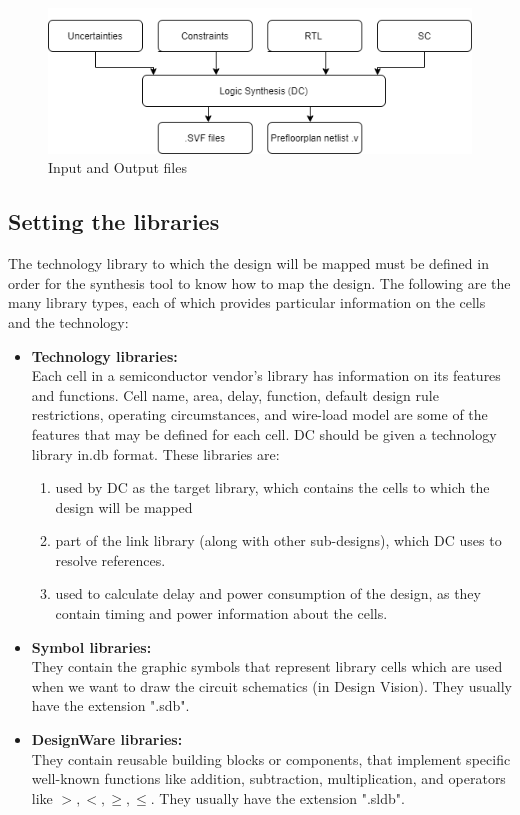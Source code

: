 \documentclass[../main.tex]{subfiles}
\begin{document}
\begin{figure}[h]
    \centering
    \includegraphics[scale = 0.8]{diagrams/ip_op_syn.png}
    \caption{Input and Output files}
    \label{fig:ip_op_syn}
\end{figure}
\subsection{Setting the libraries}
The technology library to which the design will be mapped must be defined in order for the synthesis tool to know how to map the design. The following are the many library types, each of which provides particular information on the cells and the technology:

\begin{itemize}
\item \textbf{Technology libraries:} \\
Each cell in a semiconductor vendor's library has information on its features and functions. Cell name, area, delay, function, default design rule restrictions, operating circumstances, and wire-load model are some of the features that may be defined for each cell. DC should be given a technology library in.db format. These libraries are:
    \begin{enumerate}
        \item used by DC as the target library, which contains the cells to which the design will be mapped
        \item part of the link library (along with other sub-designs), which DC uses to resolve references.
        \item used to calculate delay and power consumption of the design, as they contain timing and power information about the cells.
    \end{enumerate}

\item \textbf{Symbol libraries:}\\
They contain the graphic symbols that represent library cells which are used when we want to draw the circuit schematics (in Design Vision). They usually have the extension ".sdb".

\item \textbf{DesignWare libraries:}\\
They contain reusable building blocks or components, that implement specific well-known functions like addition, subtraction, multiplication, and operators like \(>, <, \geq, \leq\).
They usually have the extension ".sldb".
\end{itemize}
\end{document}
